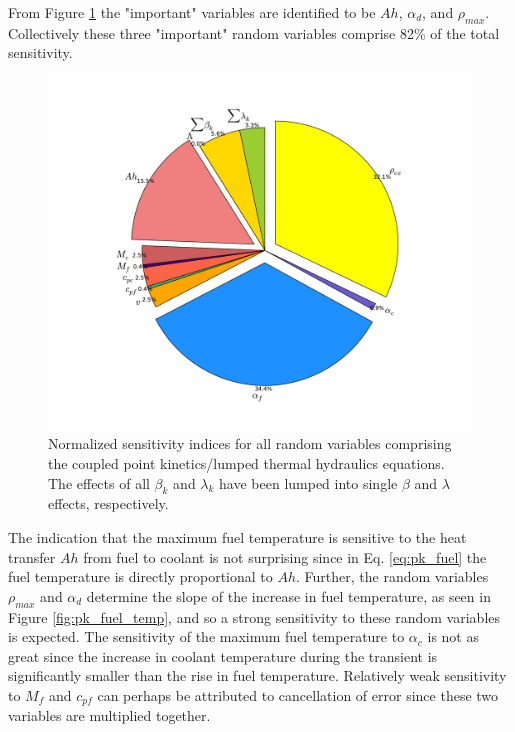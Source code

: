 From Figure \ref{fig:pk_importance_pie} the "important" variables are identified to be $Ah$, $\alpha_d$, and $\rho_{max}$. Collectively these three "important" random variables comprise 82\% of the total sensitivity. 
\begin{figure}[!htb]
\caption[Normalized sensitivity indices for random variables comprising the coupled point kinetics/lumped thermal hydraulics equations.]{ \label{fig:pk_importance_pie}
Normalized sensitivity indices for all random variables comprising the coupled point kinetics/lumped thermal hydraulics equations. The effects of all $\beta_k$ and $\lambda_k$ have been lumped into single $\beta$ and $\lambda$ effects, respectively. 
}
 \begin{center}
  \includegraphics[scale=.5]{./Chapter3/pk_importance_pie.pdf}
 \end{center}
\end{figure}
The indication that the maximum fuel temperature is sensitive to the heat transfer $Ah$ from fuel to coolant is not surprising since in Eq. \ref{eq:pk_fuel} the fuel temperature is directly proportional to $Ah$. Further, the random variables $\rho_{max}$ and $\alpha_d$ determine the slope of the increase in fuel temperature, as seen in Figure \ref{fig:pk_fuel_temp}, and so a strong sensitivity to these random variables is expected. The sensitivity of the maximum fuel temperature to $\alpha_c$ is not as great since the increase in coolant temperature during the transient is significantly smaller than the rise in fuel temperature. Relatively weak sensitivity to $M_f$ and $c_{pf}$ can perhaps be attributed to cancellation of error since these two variables are multiplied together.

